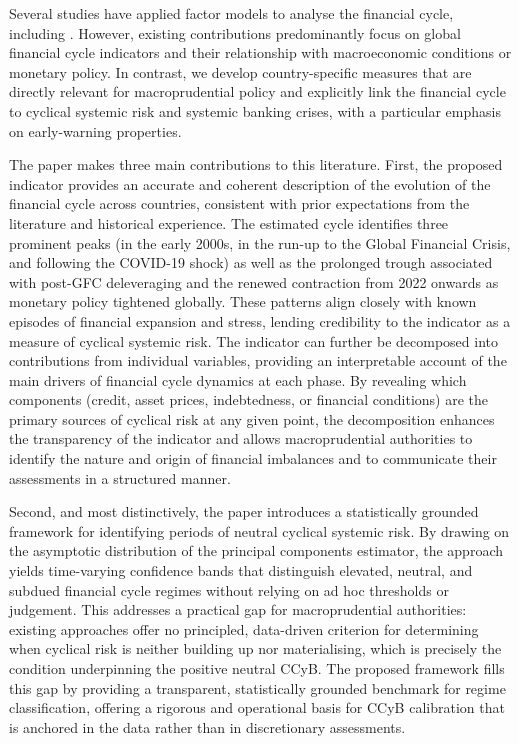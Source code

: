 Several studies have applied factor models to analyse the financial cycle, including \cite{jorg2016analyzing, menden2017dissecting, miranda2020us}. However, existing contributions predominantly focus on global financial cycle indicators and their relationship with macroeconomic conditions or monetary policy. In contrast, we develop country-specific measures that are directly relevant for macroprudential policy and explicitly link the financial cycle to cyclical systemic risk and systemic banking crises, with a particular emphasis on early-warning properties.

The paper makes three main contributions to this literature. First, the proposed indicator provides an accurate and coherent description of the evolution of the financial cycle across countries, consistent with prior expectations from the literature and historical experience. The estimated cycle identifies three prominent peaks (in the early 2000s, in the run-up to the Global Financial Crisis, and following the COVID-19 shock) as well as the prolonged trough associated with post-GFC deleveraging and the renewed contraction from 2022 onwards as monetary policy tightened globally. These patterns align closely with known episodes of financial expansion and stress, lending credibility to the indicator as a measure of cyclical systemic risk. The indicator can further be decomposed into contributions from individual variables, providing an interpretable account of the main drivers of financial cycle dynamics at each phase. By revealing which components (credit, asset prices, indebtedness, or financial conditions) are the primary sources of cyclical risk at any given point, the decomposition enhances the transparency of the indicator and allows macroprudential authorities to identify the nature and origin of financial imbalances and to communicate their assessments in a structured manner.

Second, and most distinctively, the paper introduces a statistically grounded framework for identifying periods of neutral cyclical systemic risk. By drawing on the asymptotic distribution of the principal components estimator, the approach yields time-varying confidence bands that distinguish elevated, neutral, and subdued financial cycle regimes without relying on ad hoc thresholds or judgement. This addresses a practical gap for macroprudential authorities: existing approaches offer no principled, data-driven criterion for determining when cyclical risk is neither building up nor materialising, which is precisely the condition underpinning the positive neutral CCyB. The proposed framework fills this gap by providing a transparent, statistically grounded benchmark for regime classification, offering a rigorous and operational basis for CCyB calibration that is anchored in the data rather than in discretionary assessments.

